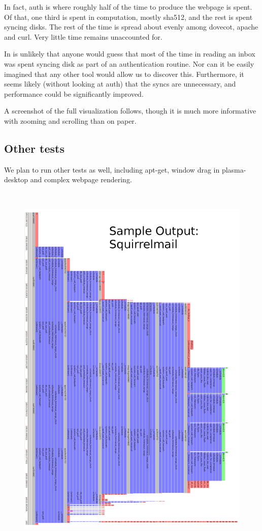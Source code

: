 \documentclass[10pt]{article}
\begin{document}
In fact, auth is where roughly half of the time to produce the webpage is spent.  Of that, one third is spent in computation, mostly sha512, and the rest is spent syncing disks.  The rest of the time is spread about evenly among dovecot, apache and curl.  Very little time remains unaccounted for.

In is unlikely that anyone would guess that most of the time in reading an inbox was spent syncing disk as part of an authentication routine.  Nor can it be easily imagined that any other tool would allow us to discover this.  Furthermore, it seems likely (without looking at auth) that the syncs are unnecessary, and performance could be significantly improved.

A screenshot of the full visualization follows, though it is much more informative with zooming and scrolling than on paper.

\subsection{Other tests}

We plan to run other tests as well, including apt-get, window drag in plasma-desktop and complex webpage rendering.

\newpage

$ $

\newpage

\begin{figure}
\includegraphics[width=6in]{squirrelmail}
\end{figure}
\end{document}
